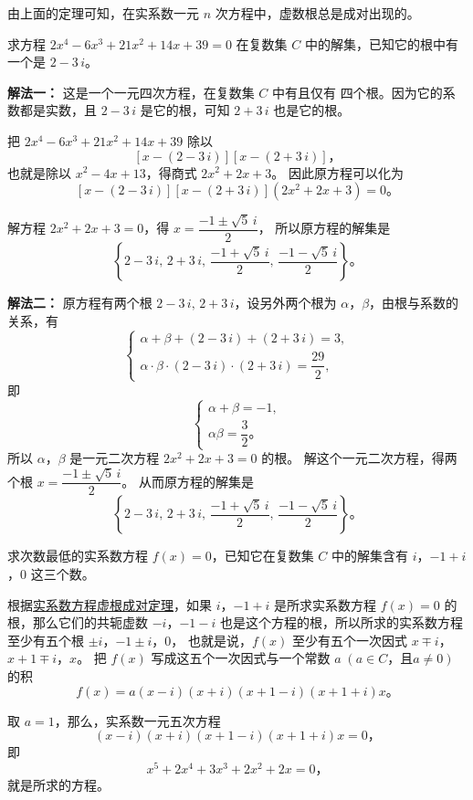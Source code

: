 由上面的定理可知，在实系数一元 $n$ 次方程中，虚数根总是成对出现的。


\liti 求方程 $2x^4 - 6x^3 + 21x^2 + 14x + 39 = 0$ 在复数集 $C$
中的解集，已知它的根中有一个是 $2 - 3\,i$。

\textbf{解法一：} 这是一个一元四次方程，在复数集 $C$ 中有且仅有
四个根。因为它的系数都是实数，且 $2 - 3\,i$ 是它的根，可知
$2 + 3\,i$ 也是它的根。

把 $2x^4 - 6x^3 + 21x^2 + 14x + 39$ 除以
$$ [x - (2 - 3\,i)] [x - (2 + 3\,i)] \text{，} $$
也就是除以 $x^2 - 4x + 13$，得商式 $2x^2 + 2x + 3$。
因此原方程可以化为
$$ [x - (2 - 3\,i)] [x - (2 + 3\,i)] (2x^2 + 2x + 3) = 0 \text{。} $$

解方程 $2x^2 + 2x + 3 = 0$，得 $x = \dfrac{-1 \pm \sqrt{5}\,i}{2}$，
所以原方程的解集是
$$ \left\{ 2 - 3\,i,\, 2 + 3\,i,\, \dfrac{-1 + \sqrt{5}\,i}{2},\, \dfrac{-1 - \sqrt{5}\,i}{2}\right\} \text{。} $$

\textbf{解法二：} 原方程有两个根 $2 - 3\,i,\, 2 + 3\,i$，设另外两个根为
$\alpha$，$\beta$，由根与系数的关系，有
$$\begin{cases}
    \alpha + \beta + (2 - 3\,i) + (2 + 3\,i) = 3, \\
    \alpha \cdot \beta \cdot (2 - 3\,i) \cdot (2 + 3\,i) = \dfrac{29}{2},
\end{cases}$$
即
$$\begin{cases}
    \alpha + \beta = -1, \\
    \alpha\beta = \dfrac{3}{2} \text{。}
\end{cases}$$
所以 $\alpha$，$\beta$ 是一元二次方程 $2x^2 + 2x + 3 = 0$ 的根。
解这个一元二次方程，得两个根 $x = \dfrac{-1 \pm \sqrt{5}\,i}{2}$。
从而原方程的解集是
$$ \left\{ 2 - 3\,i,\, 2 + 3\,i,\, \dfrac{-1 + \sqrt{5}\,i}{2},\, \dfrac{-1 - \sqrt{5}\,i}{2}\right\} \text{。} $$



\liti 求次数最低的实系数方程 $f(x) = 0$，已知它在复数集 $C$
中的解集含有 $i$，$-1 + i$，$0$ 这三个数。

\jie 根据\hyperref[theorem:xgcd]{实系数方程虚根成对定理}，如果 $i$，$-1 + i$
是所求实系数方程 $f(x) = 0$ 的根，那么它们的共轭虚数 $-i$，$-1 - i$
也是这个方程的根，所以所求的实系数方程至少有五个根 $\pm i$，$-1 \pm i$，$0$，
也就是说，$f(x)$ 至少有五个一次因式 $x \mp i$，$x + 1 \mp i$，$x$。
把 $f(x)$ 写成这五个一次因式与一个常数 $a \; (a \in C \text{，且} a \neq 0)$ 的积
$$ f(x) = a (x - i) (x + i) (x + 1 - i) (x + 1 + i) x \text{。} $$

取 $a = 1$，那么，实系数一元五次方程
$$ (x - i) (x + i) (x + 1 - i) (x + 1 + i) x = 0 \text{，} $$
即
$$ x^5 + 2x^4 + 3x^3 + 2x^2 + 2x = 0 \text{，} $$
就是所求的方程。

